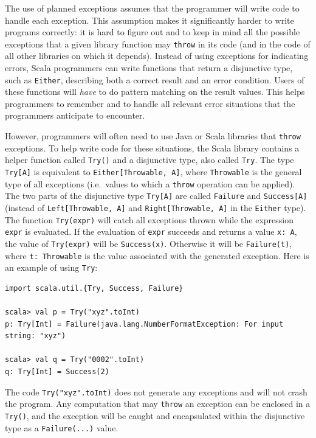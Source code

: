 The use of planned exceptions assumes that the programmer will write
code to handle each exception. This assumption makes it significantly
harder to write programs correctly: it is hard to figure out and to
keep in mind all the possible exceptions that a given library function
may \lstinline!throw! in its code (and in the code of all other libraries
on which it depends). Instead of using exceptions for indicating errors,
Scala programmers can write functions that return a disjunctive type,
such as \lstinline!Either!, describing both a correct result and
an error condition. Users of these functions will \emph{have} to do
pattern matching on the result values. This helps programmers to remember
and to handle all relevant error situations that the programmers anticipate
to encounter.

However, programmers will often need to use Java or Scala libraries
that \lstinline!throw! exceptions. To help write code for these situations,
the Scala library contains a helper function called \lstinline!Try()!
and a disjunctive type, also called \lstinline!Try!. The type \lstinline!Try[A]!
is equivalent to \lstinline!Either[Throwable, A]!, where \lstinline!Throwable!
is the general type of all exceptions (i.e.~values to which a \lstinline!throw!
operation can be applied). The two parts of the disjunctive type \lstinline!Try[A]!
are called \lstinline!Failure! and \lstinline!Success[A]! (instead
of \lstinline!Left[Throwable, A]! and \lstinline!Right[Throwable, A]!
in the \lstinline!Either! type). The function \lstinline!Try(expr)!
will catch all exceptions thrown while the expression \lstinline!expr!
is evaluated. If the evaluation of \lstinline!expr! succeeds and
returns a value \lstinline!x: A!, the value of \lstinline!Try(expr)!
will be \lstinline!Success(x)!. Otherwise it will be \lstinline!Failure(t)!,
where \lstinline!t: Throwable! is the value associated with the generated
exception. Here is an example of using \lstinline!Try!:
\begin{lstlisting}
import scala.util.{Try, Success, Failure}

scala> val p = Try("xyz".toInt)
p: Try[Int] = Failure(java.lang.NumberFormatException: For input string: "xyz")

scala> val q = Try("0002".toInt)
q: Try[Int] = Success(2) 
\end{lstlisting}
The code \lstinline!Try("xyz".toInt)! does not generate any exceptions
and will not crash the program. Any computation that may \lstinline!throw!
an exception can be enclosed in a \lstinline!Try()!, and the exception
will be caught and encapsulated within the disjunctive type as a \lstinline!Failure(...)!
value.

